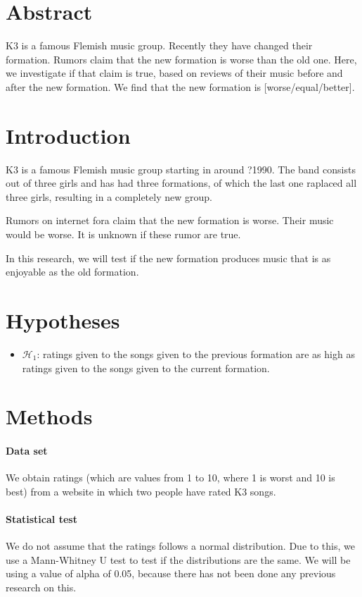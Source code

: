 \documentclass{article}
\begin{document}
\section{Abstract}

K3 is a famous Flemish music group.
Recently they have changed their formation.
Rumors claim that the new formation is worse
than the old one.
Here, we investigate if that claim is true,
based on reviews of their music before
and after the new formation.
We find that the new formation is 
[worse/equal/better].

\section{Introduction}

K3 is a famous Flemish music group
starting in around ?1990.
The band consists out of three girls
and has had three formations, of which
the last one raplaced all three girls,
resulting in a completely new group.

Rumors on internet fora claim that the new
formation is worse. Their music would be
worse. It is unknown if these rumor are true.

In this research, we will test if the new
formation produces music that is as enjoyable
as the old formation.

\section{Hypotheses}

\begin{itemize}
  \item $\mathcal{H}_1$: 
  ratings given to the songs given
  to the previous formation are as high
  as ratings given to the songs given to the
  current formation.
\end{itemize}

\section{Methods}

\paragraph{Data set}
We obtain ratings (which are values from
1 to 10, where 1 is worst and 10 is best) 
from a website in which two people
have rated K3 songs. 

\paragraph{Statistical test}
We do not assume that the 
ratings follows a normal distribution. 
Due to this,
we use a Mann-Whitney U test to test if
the distributions are the same.
We will be using a value of alpha of 0.05,
because there has not been done any previous
research on this.
\end{document}
